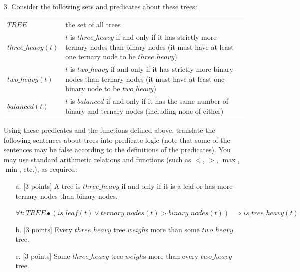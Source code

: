 \documentclass[12pt,fleqn]{article}
\begin{document}
\begin{enumerate}
\item[3.] Consider the following sets and predicates about these trees:

\begin{center}
\begin{tabular}{lp{4in}}
$TREE$ & the set of all trees\\
$three\_heavy(t)$ & $t$ is $three\_heavy$ if and only if it has strictly more ternary nodes than binary nodes (it must have at least one ternary node to be $three\_heavy$)\\
$two\_heavy(t)$ & $t$ is $two\_heavy$ if and only if it has strictly more binary nodes than ternary nodes (it must have at least one binary node to be $two\_heavy$)\\
$balanced(t)$ & $t$ is $balanced$ if and only if it has the same number of binary and ternary nodes (including none of either)
\end{tabular}
\end{center}

Using these predicates and the functions defined above, translate the following sentences about trees into predicate logic (note that some of the sentences may be false according to the definitions of the predicates). You may use standard arithmetic relations and functions (such as $<$, $>$, $\max$, $\min$, etc.), as required:

\begin{enumerate}
\item[a.] [3 points] A tree is $three\_heavy$ if and only if it is a leaf or has more ternary nodes than binary nodes. 

\color{blue}
$\forall t:TREE \bullet (is\_leaf(t) \lor ternary\_nodes(t) > binary\_nodes(t)) \implies is\_tree\_heavy(t) $ \\
\color{black}
\item[b.] [3 points] Every $three\_heavy$ tree $weigh$s more than some $two\_heavy$ tree. 

\vspace{1in} %

\item[c.] [3 points] Some $three\_heavy$ tree $weigh$s more than every $two\_heavy$ tree. 


\end{enumerate}
\end{enumerate}
\end{document}
